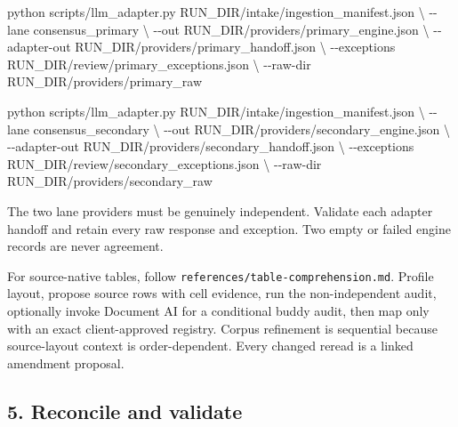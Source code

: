 \documentclass[
]{article}
\newenvironment{Shaded}{}{}
\newcommand{\AttributeTok}[1]{\textcolor[rgb]{0.49,0.56,0.16}{#1}}
\newcommand{\DataTypeTok}[1]{\textcolor[rgb]{0.56,0.13,0.00}{#1}}
\newcommand{\ExtensionTok}[1]{#1}
\newcommand{\NormalTok}[1]{#1}
\begin{document}
\begin{Shaded}
\begin{Highlighting}[]
\ExtensionTok{python}\NormalTok{ scripts/llm\_adapter.py RUN\_DIR/intake/ingestion\_manifest.json }\DataTypeTok{\textbackslash{}}
  \AttributeTok{{-}{-}lane}\NormalTok{ consensus\_primary }\DataTypeTok{\textbackslash{}}
  \AttributeTok{{-}{-}out}\NormalTok{ RUN\_DIR/providers/primary\_engine.json }\DataTypeTok{\textbackslash{}}
  \AttributeTok{{-}{-}adapter{-}out}\NormalTok{ RUN\_DIR/providers/primary\_handoff.json }\DataTypeTok{\textbackslash{}}
  \AttributeTok{{-}{-}exceptions}\NormalTok{ RUN\_DIR/review/primary\_exceptions.json }\DataTypeTok{\textbackslash{}}
  \AttributeTok{{-}{-}raw{-}dir}\NormalTok{ RUN\_DIR/providers/primary\_raw}

\ExtensionTok{python}\NormalTok{ scripts/llm\_adapter.py RUN\_DIR/intake/ingestion\_manifest.json }\DataTypeTok{\textbackslash{}}
  \AttributeTok{{-}{-}lane}\NormalTok{ consensus\_secondary }\DataTypeTok{\textbackslash{}}
  \AttributeTok{{-}{-}out}\NormalTok{ RUN\_DIR/providers/secondary\_engine.json }\DataTypeTok{\textbackslash{}}
  \AttributeTok{{-}{-}adapter{-}out}\NormalTok{ RUN\_DIR/providers/secondary\_handoff.json }\DataTypeTok{\textbackslash{}}
  \AttributeTok{{-}{-}exceptions}\NormalTok{ RUN\_DIR/review/secondary\_exceptions.json }\DataTypeTok{\textbackslash{}}
  \AttributeTok{{-}{-}raw{-}dir}\NormalTok{ RUN\_DIR/providers/secondary\_raw}
\end{Highlighting}
\end{Shaded}

The two lane providers must be genuinely independent. Validate each
adapter handoff and retain every raw response and exception. Two empty
or failed engine records are never agreement.

For source-native tables, follow
\texttt{references/\allowbreak{}table-\allowbreak{}comprehension.md}.
Profile layout, propose source rows with cell evidence, run the
non-independent audit, optionally invoke Document AI for a conditional
buddy audit, then map only with an exact client-approved registry.
Corpus refinement is sequential because source-layout context is
order-dependent. Every changed reread is a linked amendment proposal.

\subsection{5. Reconcile and validate}\label{reconcile-and-validate}
\end{document}
